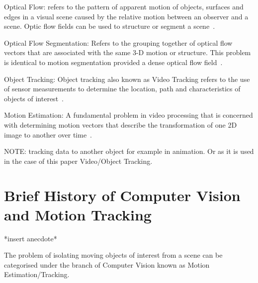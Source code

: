 Optical Flow: refers to the pattern of apparent motion of objects, surfaces and
edges in a visual scene caused by the relative motion between an observer and a
scene. Optic flow fields can be used to structure or segment a scene~\cite{Forsyth2012}.

Optical Flow Segmentation: Refers to the grouping together of optical flow
vectors that are associated with the same 3-D motion or structure. This problem
is identical to motion segmentation provided a dense optical flow field~\cite{Tekalp2014}.

Object Tracking: Object tracking also known as Video Tracking refers to the use
of sensor measurements to determine the location, path and characteristics of
objects of interest~\cite{Challa2011}.
 
Motion Estimation: A fundamental problem in video processing that is concerned
with determining motion vectors that describe the transformation of one 2D
image to another over time~\cite{Tekalp2014}.

NOTE:\@
tracking data to another object for example in animation. Or as it is used in the
case of this paper Video/Object Tracking.

\section{Brief History of Computer Vision and Motion Tracking}
*insert anecdote*

The problem of isolating moving objects of interest from a scene can
be categorised under the branch of Computer Vision known as Motion
Estimation/Tracking.

